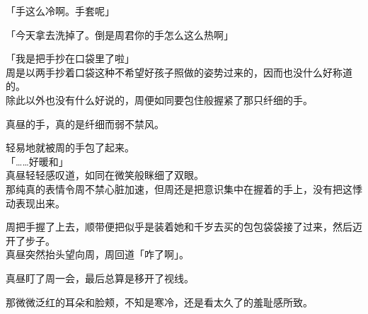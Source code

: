 「手这么冷啊。手套呢」

「今天拿去洗掉了。倒是周君你的手怎么这么热啊」

「我是把手抄在口袋里了啦」\\

周是以两手抄着口袋这种不希望好孩子照做的姿势过来的，因而也没什么好称道的。\\

除此以外也没有什么好说的，周便如同要包住般握紧了那只纤细的手。

真昼的手，真的是纤细而弱不禁风。

轻易地就被周的手包了起来。\\

「……好暖和」\\

真昼轻轻感叹道，如同在微笑般眯细了双眼。\\

那纯真的表情令周不禁心脏加速，但周还是把意识集中在握着的手上，没有把这悸动表现出来。

周把手握了上去，顺带便把似乎是装着她和千岁去买的包包袋袋接了过来，然后迈开了步子。\\

真昼突然抬头望向周，周回道「咋了啊」。

真昼盯了周一会，最后总算是移开了视线。

那微微泛红的耳朵和脸颊，不知是寒冷，还是看太久了的羞耻感所致。\\


